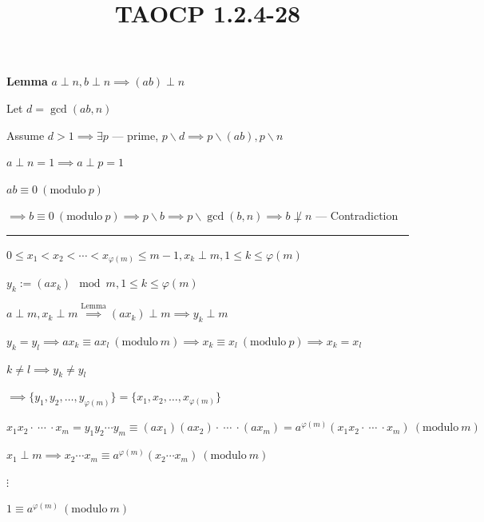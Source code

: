 \documentclass{article}
\title{TAOCP 1.2.4\mbox{-}28}
\begin{document}
\maketitle

\textbf{Lemma} \( a \perp n, b \perp n \implies (ab) \perp n \)

Let \( d = \gcd(ab, n) \)

Assume \( d > 1 \implies \exists p \) --- prime, \( p \backslash d \implies p \backslash (ab), p \backslash n \)

\( a \perp n = 1 \implies a \perp p = 1 \)

\( ab \equiv 0\ (\mathrm{modulo}\ p) \)

\( \implies b \equiv 0\ (\mathrm{modulo}\ p) \implies p \backslash b \implies p \backslash \gcd(b,n) \implies b \not\perp n \) --- Contradiction

\bigskip\hrule\bigskip

\( 0 \leq x_{1} < x_{2} < \cdots < x_{\varphi(m)} \leq m - 1, x_{k} \perp m, 1 \leq k \leq \varphi(m) \)

\( y_{k} := (ax_{k}) \mod m, 1 \leq k \leq \varphi(m) \)

\( a \perp m, x_{k} \perp m \overset{\text{Lemma}}{\implies} (ax_{k}) \perp m \implies y_{k} \perp m \)

\( y_{k} = y_{l} \implies ax_{k} \equiv ax_{l} \ (\mathrm{modulo}\ m) \implies x_{k} \equiv x_{l}\ (\mathrm{modulo}\ p) \implies x_{k} = x_{l} \)

\( k \neq l \implies y_{k} \neq y_{l} \)

\( \implies \{ y_{1}, y_{2}, \ldots, y_{\varphi(m)} \} = \{ x_{1}, x_{2}, \ldots, x_{\varphi(m)} \} \)

\( x_{1}x_{2} \cdot\ \cdots\ \cdot x_{m} = y_{1}y_{2}\cdots y_{m} \equiv (ax_{1})(ax_{2}) \cdot\ \cdots\ \cdot (ax_{m}) = a^{\varphi(m)}(x_{1}x_{2} \cdot\ \cdots\ \cdot x_{m})\ (\mathrm{modulo}\ m) \)

\( x_{1} \perp m \implies x_{2} \cdots x_{m} \equiv a^{\varphi(m)}(x_{2}\cdots x_{m})\ (\mathrm{modulo}\ m) \)

\( \vdots \)

\( 1 \equiv a^{\varphi(m)} \ (\mathrm{modulo}\ m) \)
\end{document}
